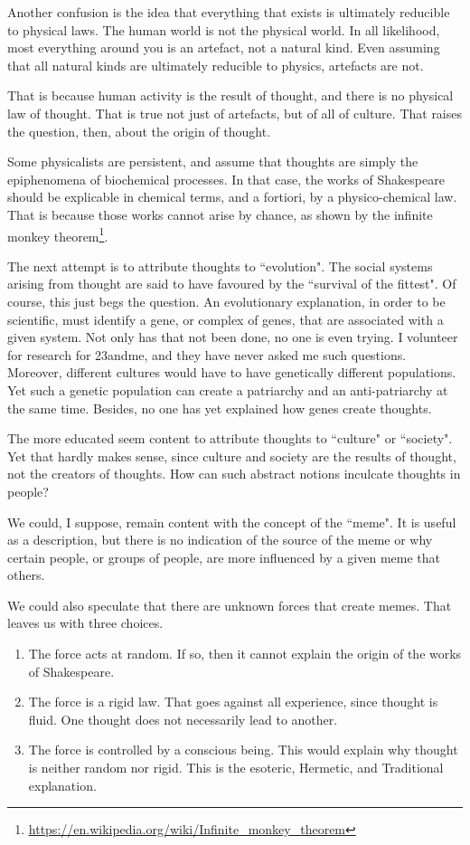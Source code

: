 Another confusion is the idea that everything that exists is ultimately reducible to physical laws. The human world is not the physical world. In all likelihood, most everything around you is an artefact, not a natural kind. Even assuming that all natural kinds are ultimately reducible to physics, artefacts are not.

That is because human activity is the result of thought, and there is no physical law of thought. That is true not just of artefacts, but of all of culture. That raises the question, then, about the origin of thought.

Some physicalists are persistent, and assume that thoughts are simply the epiphenomena of biochemical processes. In that case, the works of Shakespeare should be explicable in chemical terms, and a fortiori, by a physico-chemical law. That is because those works cannot arise by chance, as shown by the infinite monkey theorem\footnote{\url{https://en.wikipedia.org/wiki/Infinite_monkey_theorem}}.

The next attempt is to attribute thoughts to ``evolution". The social systems arising from thought are said to have favoured by the ``survival of the fittest". Of course, this just begs the question. An evolutionary explanation, in order to be scientific, must identify a gene, or complex of genes, that are associated with a given system. Not only has that not been done, no one is even trying. I volunteer for research for 23andme, and they have never asked me such questions. Moreover, different cultures would have to have genetically different populations. Yet such a genetic population can create a patriarchy and an anti-patriarchy at the same time. Besides, no one has yet explained how genes create thoughts.

The more educated seem content to attribute thoughts to ``culture" or ``society". Yet that hardly makes sense, since culture and society are the results of thought, not the creators of thoughts. How can such abstract notions inculcate thoughts in people?

We could, I suppose, remain content with the concept of the ``meme". It is useful as a description, but there is no indication of the source of the meme or why certain people, or groups of people, are more influenced by a given meme that others.

We could also speculate that there are unknown forces that create memes. That leaves us with three choices.

\begin{enumerate}
\item The force acts at random. If so, then it cannot explain the origin of the works of Shakespeare. 
\item The force is a rigid law. That goes against all experience, since thought is fluid. One thought does not necessarily lead to another. 
\item The force is controlled by a conscious being. This would explain why thought is neither random nor rigid. This is the esoteric, Hermetic, and Traditional explanation. 
\end{enumerate}
